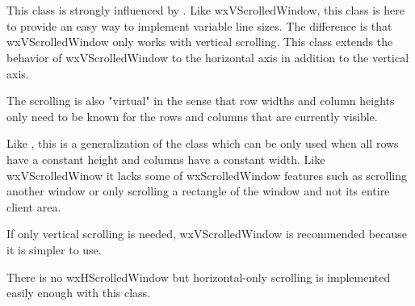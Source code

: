 
\section{}\label{wxhvscrolledwindow}

This class is strongly influenced by 
. 
Like wxVScrolledWindow, this class is here to provide an easy way to implement
variable line sizes.  The difference is that wxVScrolledWindow only works with
vertical scrolling.  This class extends the behavior of wxVScrolledWindow to
the horizontal axis in addition to the vertical axis.

The scrolling is also "virtual" in the sense that row widths and column heights
only need to be known for the rows and columns that are currently visible.

Like , this is a generalization
of the  class which can be only
used when all rows have a constant height and columns have a constant width. 
Like wxVScrolledWinow it lacks some of wxScrolledWindow features such as
scrolling another window or only scrolling a rectangle of the window and not
its entire client area.

If only vertical scrolling is needed, wxVScrolledWindow is recommended
because it is simpler to use.
   
There is no wxHScrolledWindow but horizontal-only scrolling is implemented
easily enough with this class.

